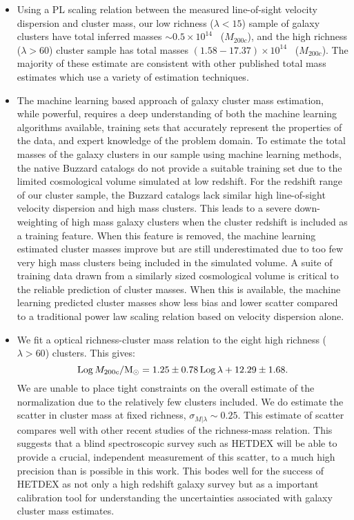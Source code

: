 \begin{itemize}
	\item Using a PL scaling relation between the measured line-of-sight velocity dispersion and cluster mass, our low richness ($\lambda < 15$) sample of galaxy clusters have total inferred masses $\sim 0.5 \times 10^{14}$ \Msol\ ($M_{200c}$), and the high richness ($\lambda > 60$) cluster sample has total masses $(1.58-17.37) \times 10^{14}$ \Msol\ ($M_{200c}$). The majority of these estimate are consistent with other published total mass estimates which use a variety of estimation techniques. 
	
	\item The machine learning based approach of galaxy cluster mass estimation, while powerful, requires a deep understanding of both the machine learning algorithms available, training sets that accurately represent the properties of the data, and expert knowledge of the problem domain. To estimate the total masses of the galaxy clusters in our sample using machine learning methods, the native Buzzard catalogs do not provide a suitable training set due to the limited cosmological volume simulated at low redshift. For the redshift range of our cluster sample, the Buzzard catalogs lack similar high line-of-sight velocity dispersion and high mass clusters. This leads to a severe down-weighting of high mass galaxy clusters when the cluster redshift is included as a training feature. When this feature is removed, the machine learning estimated cluster masses improve but are still underestimated due to too few very high mass clusters being included in the simulated volume. A suite of training data drawn from a similarly sized cosmological volume is critical to the reliable prediction of cluster masses. When this is available, the machine learning predicted cluster masses show less bias and lower scatter compared to a traditional power law scaling relation based on velocity dispersion alone.

	\item We fit a optical richness-cluster mass relation to the eight high richness ($\lambda > 60$) clusters. This gives:
		\begin{equation}
			\mathrm{Log}\,M_{200c}/\hbox{$\mathrm{M}_\odot$}=1.25\pm{0.78}\, \mathrm{Log}\,\lambda + 12.29\pm{1.68}.  
		\end{equation}
We are unable to place tight constraints on the overall estimate of the normalization due to the relatively few clusters included. We do estimate the scatter in cluster mass at fixed richness, $\sigma_{M|\lambda} \sim 0.25$. This estimate of scatter compares well with other recent studies of the richness-mass relation. This suggests that a blind spectroscopic survey such as HETDEX will be able to provide a crucial, independent measurement of this scatter, to a much high precision than is possible in this work. This bodes well for the success of HETDEX as not only a high redshift galaxy survey but as a important calibration tool for understanding the uncertainties associated with galaxy cluster mass estimates. 
\end{itemize}

